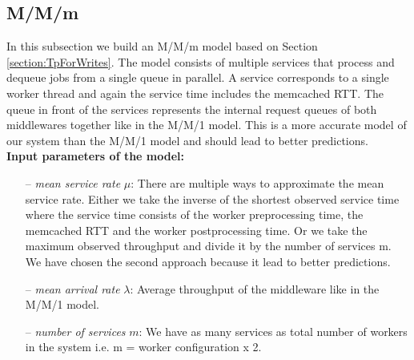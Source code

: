 \subsection{M/M/m}
In this subsection we build an M/M/m model based on Section \ref{section:TpForWrites}. The model consists of multiple services that process and dequeue jobs from a single queue in parallel. A service corresponds to a single worker thread and again the service time includes the memcached RTT. The queue in front of the services represents the internal request queues of both middlewares together like in the M/M/1 model. This is a more accurate model of our system than the M/M/1 model and should lead to better predictions. \\

\textbf{Input parameters of the model:} 
\begin{itemize}
\item[--] \textit{mean service rate} $\mu$: There are multiple ways to approximate the mean service rate. Either we take the inverse of the shortest observed service time where the service time consists of the worker preprocessing time, the memcached RTT and the worker postprocessing time. Or we take the maximum observed throughput and divide it by the number of services m. We have chosen the second approach because it lead to better predictions.
\item[--] \textit{mean arrival rate} $\lambda$: Average throughput of the middleware like in the M/M/1 model.
\item[--] \textit{number of services} $m$: We have as many services as total number of workers in the system i.e. m = worker configuration x 2.
\end{itemize}

